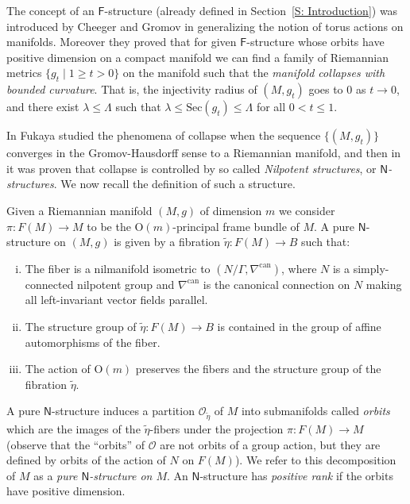 \documentclass[12pt,a4paper,reqno]{amsart}
\theoremstyle{definition}
\numberwithin{equation}{section}
\newcommand{\F}{\mathsf{F}}
\newcommand{\Ns}{\mathsf{N}}
\newcommand{\Or}{\mathrm{O}}
\newcommand{\Sec}{\mathrm{Sec}}
\begin{document}
The concept of an $\F$-structure (already defined in Section~\ref{S: Introduction}) was introduced by Cheeger and Gromov in \cite{CheegerGromov1986} generalizing the notion of torus actions on manifolds. Moreover they proved that for given $\F$-structure  whose orbits have positive dimension on a compact manifold we can find a family of Riemannian metrics $\{g_t\mid 1\geq t> 0\}$ on the manifold such that the \emph{manifold collapses with bounded curvature}. That is, the injectivity radius of  $(M,g_t)$  goes to $0$ as $t\to 0$, and there exist $\lambda\leq \Lambda$ such that $\lambda \leq \Sec(g_t)\leq \Lambda$ for all $0<t\leq 1$.

In \cite{Fukaya1987,Fukaya1989} Fukaya studied the phenomena of collapse when the sequence $\{(M,g_t)\}$ converges in the Gromov-Hausdorff sense to a Riemannian manifold, and then in \cite{CheegerFukayaGromov1992} it was proven that collapse is controlled by so called \emph{Nilpotent structures}, or \emph{$\Ns$-structures}. We now recall the definition of such a structure.

Given a Riemannian manifold $(M,g)$  of dimension $m$ we consider $\pi\colon F(M)\to M$ to be the $\Or(m)$-principal frame bundle of $M$.  A pure $\Ns$-structure on $(M,g)$ is given by a fibration $\tilde{\eta}\colon F(M)\to B$ such that:
\begin{enumerate}[(i)]
\item The fiber is a nilmanifold isometric to $(N/\Gamma,\nabla^{\mathrm{can}})$, where $N$ is a simply-connected nilpotent group and $\nabla^{\mathrm{can}}$ is the canonical connection on $N$ making all left-invariant vector fields parallel.
\item The structure group of $\tilde{\eta}\colon F(M)\to B$ is contained in the group of affine automorphisms of the fiber.
\item The action of $\Or(m)$ preserves the fibers and the structure group of the fibration $\tilde{\eta}$.
\end{enumerate}  
A pure $\Ns$-structure induces a partition $\mathscr{O}_{\tilde{\eta}}$ of $M$ into submanifolds called \emph{orbits}  which are the images of the $\tilde{\eta}$-fibers under the projection $\pi\colon F(M)\to M$ (observe that the ``orbits'' of $\mathscr{O}$ are not orbits of a group action, but they are defined by orbits of the action of $N$ on $F(M)$). We refer to this decomposition of $M$ as a \emph{pure $\Ns$-structure on $M$}. An $\Ns$-structure has \emph{positive rank} if the orbits have positive dimension.
\end{document}
